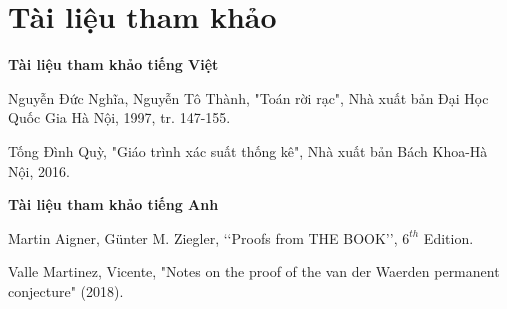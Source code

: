 \documentclass[a4paper, 12pt]{report}
\begin{document}
\chapter*{Tài liệu tham khảo}
\mdseries 
\textbf{Tài liệu tham khảo tiếng Việt}

\begin{enumerate}[label=\textrm{[\arabic*.]}]
\item Nguyễn Đức Nghĩa, Nguyễn Tô Thành, "Toán rời rạc", Nhà xuất bản Đại Học Quốc Gia Hà Nội, 1997, tr. 147-155.
\item Tống Đình Quỳ, "Giáo trình xác suất thống kê", Nhà xuất bản Bách Khoa-Hà Nội, 2016.
\end{enumerate}
 \textbf{Tài liệu tham khảo tiếng Anh}
\begin{enumerate}[label=\textrm{[\arabic*.]}]
\item
	Martin Aigner, Günter M. Ziegler, ‘‘Proofs from THE BOOK’’, $6^{th}$ Edition.
\item
	Valle Martinez, Vicente, "Notes on the proof of the van der Waerden permanent conjecture" (2018).
\end{enumerate}
\end{document}
